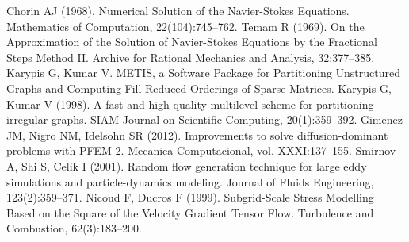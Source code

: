  Chorin AJ (1968). Numerical Solution of the Navier-Stokes Equations. Mathematics of Computation, 22(104):745--762.
 Temam R (1969). On the Approximation of the Solution of Navier-Stokes Equations by the Fractional Steps Method II. Archive for Rational Mechanics and Analysis, 32:377--385.
 Karypis G, Kumar V. METIS, a Software Package for Partitioning Unstructured Graphs and Computing Fill-Reduced Orderings of Sparse Matrices.
 Karypis G, Kumar V (1998). A fast and high quality multilevel scheme for partitioning irregular graphs. SIAM Journal on Scientific Computing, 20(1):359--392.
 Gimenez JM, Nigro NM, Idelsohn SR (2012). Improvements to solve diffusion-dominant problems with PFEM-2. Mecanica Computacional, vol. XXXI:137--155.
 Smirnov A, Shi S, Celik I (2001). Random flow generation technique for large eddy simulations and particle-dynamics modeling. Journal of Fluids Engineering, 123(2):359--371.
 Nicoud F, Ducros F (1999). Subgrid-Scale Stress Modelling Based on the Square of the Velocity Gradient Tensor Flow. Turbulence and Combustion, 62(3):183--200.
